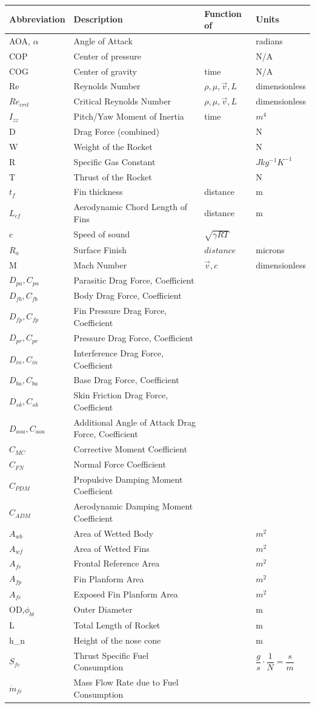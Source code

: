 \documentclass[]{article}
\begin{document}
\begin{longtable}[c]{@{}llll@{}}
\toprule
Abbreviation & Description & Function of & Units\tabularnewline
\midrule
\endhead
AOA, \(\alpha\) & Angle of Attack & & radians\tabularnewline
COP & Center of pressure & & N/A\tabularnewline
COG & Center of gravity & time & N/A\tabularnewline
Re & Reynolds Number & \( \rho,\mu,\vec{v},L \) &
dimensionless\tabularnewline
\(Re_{crit}\) & Critical Reynolds Number & \( \rho,\mu,\vec{v},L \) &
dimensionless\tabularnewline
\(I_{zz}\) & Pitch/Yaw Moment of Inertia & time & \(m^4\)\tabularnewline
D & Drag Force (combined) & & N\tabularnewline
W & Weight of the Rocket & & N\tabularnewline
R & Specific Gas Constant & & \(J kg^{-1} K^{-1}\)\tabularnewline
T & Thrust of the Rocket & & N\tabularnewline
\(t_f\) & Fin thickness & distance & m\tabularnewline
\(L_{cf}\) & Aerodynamic Chord Length of Fins & distance &
m\tabularnewline
c & Speed of sound & \( \sqrt{\gamma RT} \) &\tabularnewline
\(R_a\) & Surface Finish & \( distance \) & microns\tabularnewline
M & Mach Number & \( \vec{v}, c \) & dimensionless\tabularnewline
\(D_{pa}, C_{pa}\) & Parasitic Drag Force, Coefficient &
&\tabularnewline
\(D_{fb}, C_{fb}\) & Body Drag Force, Coefficient & &\tabularnewline
\(D_{fp}, C_{fp}\) & Fin Pressure Drag Force, Coefficient &
&\tabularnewline
\(D_{pr}, C_{pr}\) & Pressure Drag Force, Coefficient & &\tabularnewline
\(D_{in}, C_{in}\) & Interference Drag Force, Coefficient &
&\tabularnewline
\(D_{ba}, C_{ba}\) & Base Drag Force, Coefficient & &\tabularnewline
\(D_{sk}, C_{sk}\) & Skin Friction Drag Force, Coefficient &
&\tabularnewline
\(D_{aoa}, C_{aoa}\) & Additional Angle of Attack Drag Force,
Coefficient & &\tabularnewline
\(C_{MC}\) & Corrective Moment Coefficient & &\tabularnewline
\(C_{FN}\) & Normal Force Coefficient & &\tabularnewline
\(C_{PDM}\) & Propulsive Damping Moment Coefficient & &\tabularnewline
\(C_{ADM}\) & Aerodynamic Damping Moment Coefficient & &\tabularnewline
\(A_{wb}\) & Area of Wetted Body & & \(m^2\)\tabularnewline
\(A_{wf}\) & Area of Wetted Fins & & \(m^2\)\tabularnewline
\(A_{fr}\) & Frontal Reference Area & & \(m^2\)\tabularnewline
\(A_{fp}\) & Fin Planform Area & & \(m^2\)\tabularnewline
\(A_{fe}\) & Exposed Fin Planform Area & & \(m^2\)\tabularnewline
OD,\(\phi_{bt}\) & Outer Diameter & & m\tabularnewline
L & Total Length of Rocket & & m\tabularnewline
h\_n & Height of the nose cone & & m\tabularnewline
\(S_{fc}\) & Thrust Specific Fuel Consumption & &
\(\dfrac{g}{s}\cdot \dfrac{1}{N} = \dfrac{s}{m}\)\tabularnewline
\(\dot{m}_{fc}\) & Mass Flow Rate due to Fuel Consumption & &

\end{longtable}
\end{document}
